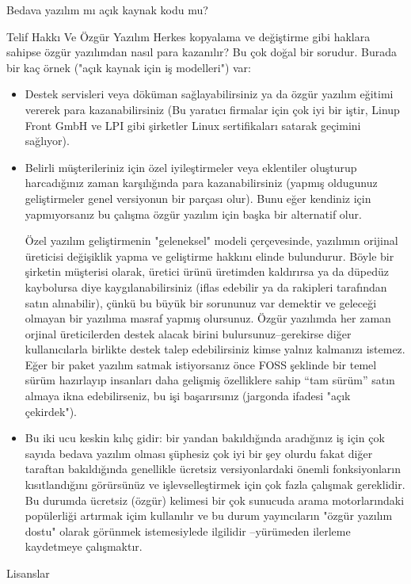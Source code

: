 \begin{section}{Bedava yazılım mı açık kaynak kodu mu?}
\begin{subsection}{Telif Hakkı Ve Özgür Yazılım}
Herkes kopyalama ve değiştirme gibi haklara sahipse özgür yazılımdan nasıl para kazanılır? Bu çok doğal bir sorudur. Burada bir kaç örnek ("açık kaynak için iş modelleri") var:

\begin{itemize}
 \item Destek servisleri veya döküman sağlayabilirsiniz ya da özgür yazılım eğitimi vererek para kazanabilirsiniz (Bu yaratıcı firmalar için çok iyi bir iştir, Linup Front GmbH ve LPI gibi şirketler Linux sertifikaları satarak geçimini sağlıyor).
 \item Belirli müşterileriniz için özel iyileştirmeler veya eklentiler oluşturup harcadığınız zaman karşılığında para kazanabilirsiniz (yapmış oldugunuz geliştirmeler genel versiyonun bir parçası olur). Bunu eğer kendiniz için yapmıyorsanız bu çalışma özgür yazılım için başka bir alternatif olur.

Özel yazılım geliştirmenin "geleneksel" modeli çerçevesinde, yazılımın orijinal üreticisi değişiklik yapma ve geliştirme hakkını elinde bulundurur. Böyle bir şirketin müşterisi olarak, üretici ürünü üretimden kaldırırsa ya da düpedüz kaybolursa diye kaygılanabilirsiniz (iflas edebilir ya da rakipleri tarafından satın alınabilir), çünkü bu büyük bir sorununuz var demektir ve geleceği olmayan bir yazılıma masraf yapmış olursunuz. Özgür yazılımda her zaman orjinal üreticilerden destek alacak birini bulursunuz--gerekirse diğer kullanıcılarla birlikte destek talep edebilirsiniz kimse yalnız kalmanızı istemez. Eğer bir paket yazılım satmak istiyorsanız önce FOSS şeklinde bir temel sürüm hazırlayıp  insanları  daha gelişmiş özelliklere sahip “tam sürüm” satın almaya ikna edebilirseniz, bu işi başarırsınız (jargonda ifadesi "açık çekirdek").

 \item Bu iki ucu keskin kılıç gidir: bir yandan bakıldığında aradığınız iş için çok sayıda bedava yazılım olması şüphesiz çok iyi bir şey olurdu fakat diğer taraftan bakıldığında genellikle ücretsiz versiyonlardaki önemli fonksiyonların kısıtlandığını görürsünüz ve işlevselleştirmek için çok fazla çalışmak gereklidir. Bu durumda ücretsiz (özgür) kelimesi bir çok sunucuda arama motorlarındaki popülerliği artırmak içim kullanılır ve bu durum yayıncıların "özgür yazılım dostu" olarak görünmek istemesiylede ilgilidir --yürümeden ilerleme kaydetmeye çalışmaktır.
 \end{itemize}
\end{subsection}
\begin{subsection}{Lisanslar}


\end{subsection}
\end{section}
